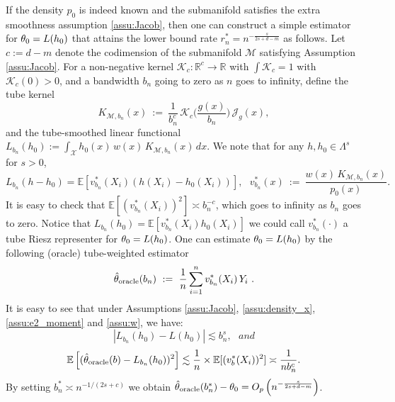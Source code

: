 \documentclass[12pt,american]{article}
\theoremstyle{definition}
\theoremstyle{plain}
\theoremstyle{definition}
\theoremstyle{plain}
\theoremstyle{plain}
\theoremstyle{plain}
\theoremstyle{plain}
\theoremstyle{plain}
\newcommand{\R}{\mathbb{R}}
\newcommand{\E}{\mathbb{E}}
\begin{document}
If the density $p_0$ is indeed known and the submanifold satisfies the extra smoothness assumption \ref{assu:Jacob}, then one can construct a simple estimator for $\theta_0=L(h_0)$ that attains the lower bound rate $r^*_{n}=n^{-\frac{s}{2s+d-m}}$ as follows. Let $c:=d-m$ denote the codimension of the submanifold $\mathcal{M}$ satisfying Assumption \ref{assu:Jacob}.
For a non-negative kernel $\mathcal{K}_c:\R^c\to\R$ with $\int \mathcal{K}_c=1$ with $\mathcal{K}_c(0)>0$, and a bandwidth $b_n$ going to zero as $n$ goes to infinity, define the tube kernel
\[
K_{\mathcal{M},b_n}(x)\ :=\ \frac{1}{b_n^{c}}\,\mathcal{K}_c\!\Big(\frac{g(x)}{b_n}\Big)\,\mathcal{J}_g(x),
\]
and the tube-smoothed linear functional $L_{b_n}(h_0):=\int_{\mathcal{X}} h_0(x)\,w(x)\,K_{\mathcal{M},b_n}(x)\,dx$. We note that for any $h,h_0\in \Lambda^s$ for $s>0$,
\[
L_{b_n}(h-h_0)=\E[v^*_{b_n}(X_i)\left(h(X_i)-h_0(X_i)\right)],~~~v^*_{b_n}(x)\ :=\ \frac{w(x)\,K_{\mathcal{M},b_n}(x)}{p_0(x)}.
\]
It is easy to check that $\E[(v^*_{b_n}(X_i))^2] \asymp b_n^{-c}$, which goes to infinity as $b_n$ goes to zero. Notice that $L_{b_n}(h_0)=\E[v^*_{b_n}(X_i)h_0(X_i)]$ we could call $v^*_{b_n}(\cdot)$ a tube Riesz representer for $\theta_0=L(h_0)$.
One can estimate $\theta_0=L(h_0)$ by the following (oracle) tube-weighted estimator
\[
\hat{\t}_{\mathrm{oracle}} (b_n)\ :=\ \frac1n\sum_{i=1}^n v^*_{b_n} (X_i)\,Y_i~.
\]
It is easy to see that under Assumptions \ref{assu:Jacob}, \ref{assu:density_x}, \ref{assu:e2_moment} and \ref{assu:w}, we have:
\[
|L_{b_n}(h_0)-L(h_0)|\lesssim b_n^{s},~~~and
\]
\[
\E\left[(\hat{\t}_{\mathrm{oracle}} (b)-L_{b_n}(h_0))^2\right]\lesssim\frac1n \times \E[(v^*_b(X_i))^2] \asymp \frac{1}{nb_n^c}.
\]
By setting $b^*_n \asymp n^{-1/(2s+c)}$ we obtain $\hat{\theta}_{\mathrm{oracle}} (b^*_n)-\theta_0=O_p\left(n^{-\frac{s}{2s+d-m}}\right)$.
\end{document}
